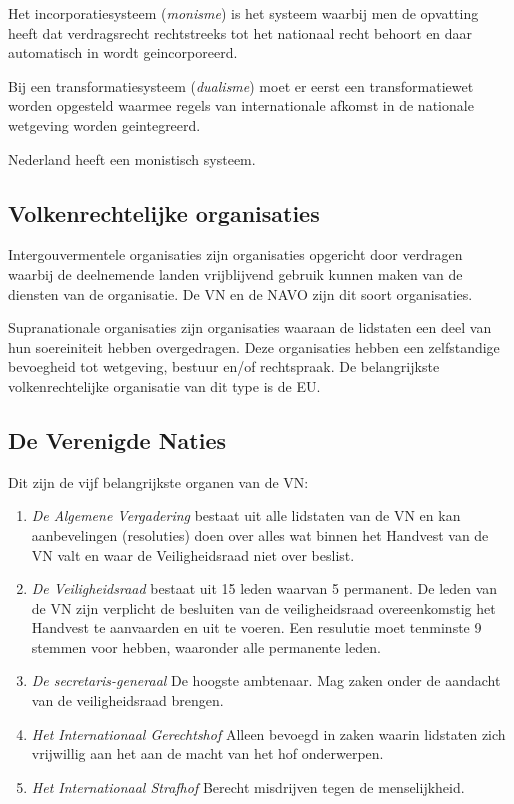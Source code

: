 \documentclass{article}
\begin{document}
Het incorporatiesysteem (\emph{monisme}) is het systeem waarbij men de opvatting
heeft dat verdragsrecht rechtstreeks tot het nationaal recht behoort en daar
automatisch in wordt geincorporeerd.

Bij een transformatiesysteem (\emph{dualisme}) moet er eerst een transformatiewet
worden opgesteld waarmee regels van internationale afkomst in de nationale wetgeving
worden geintegreerd.

Nederland heeft een monistisch systeem.

\subsection{Volkenrechtelijke organisaties}

Intergouvermentele organisaties zijn organisaties opgericht door verdragen waarbij
de deelnemende landen vrijblijvend gebruik kunnen maken van de diensten van de
organisatie. De VN en de NAVO zijn dit soort organisaties.

Supranationale organisaties zijn organisaties waaraan de lidstaten een deel van
hun soereiniteit hebben overgedragen. Deze organisaties hebben een zelfstandige
bevoegheid tot wetgeving, bestuur en/of rechtspraak. De belangrijkste volkenrechtelijke
organisatie van dit type is de EU.

\subsection{De Verenigde Naties}

Dit zijn de vijf belangrijkste organen van de VN:

\begin{enumerate}

  \item \emph{De Algemene Vergadering} bestaat uit alle lidstaten van de VN en
    kan aanbevelingen (resoluties) doen over alles wat binnen het Handvest van
    de VN valt en waar de Veiligheidsraad niet over beslist.

  \item \emph{De Veiligheidsraad} bestaat uit 15 leden waarvan 5 permanent. De
    leden van de VN zijn verplicht de besluiten van de veiligheidsraad
    overeenkomstig het Handvest te aanvaarden en uit te voeren. Een resulutie
    moet tenminste 9 stemmen voor hebben, waaronder alle permanente leden.

  \item \emph{De secretaris-generaal} De hoogste ambtenaar. Mag zaken onder de
    aandacht van de veiligheidsraad brengen.

  \item \emph{Het Internationaal Gerechtshof} Alleen bevoegd in zaken waarin
    lidstaten zich vrijwillig aan het aan de macht van het hof onderwerpen.

  \item \emph{Het Internationaal Strafhof} Berecht misdrijven tegen de
    menselijkheid.
\end{enumerate}
\end{document}
